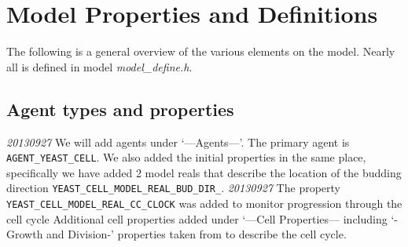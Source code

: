 \documentclass{article}
\begin{document}
\section{Model Properties and Definitions}
The following is a general overview of the various elements on the model.
Nearly all is defined in model \textit{model\_define.h}.

\subsection{Agent types and properties}
\emph{20130927} We will add agents under `---Agents---'.
The primary agent is \texttt{AGENT\_YEAST\_CELL}.
We also added the initial properties in the same place,
specifically we have added 2 model reals that describe the 
location of the budding direction \texttt{YEAST\_CELL\_MODEL\_REAL\_BUD\_DIR\_}.
\emph{20130927} The property \texttt{YEAST\_CELL\_MODEL\_REAL\_CC\_CLOCK}
was added to monitor progression through the cell cycle \cite{Charvin2009}
Additional cell properties added under `---Cell Properties--- including 
`-Growth and Division-' properties taken from \cite{Charvin2009} to describe the cell cycle.
\end{document}
